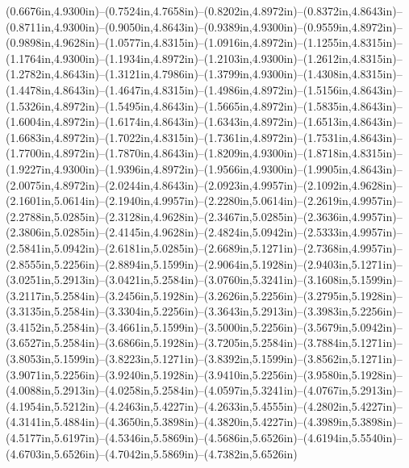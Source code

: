 (0.6676in,4.9300in)--(0.7524in,4.7658in)--(0.8202in,4.8972in)--(0.8372in,4.8643in)--(0.8711in,4.9300in)--(0.9050in,4.8643in)--(0.9389in,4.9300in)--(0.9559in,4.8972in)--(0.9898in,4.9628in)--(1.0577in,4.8315in)--(1.0916in,4.8972in)--(1.1255in,4.8315in)--(1.1764in,4.9300in)--(1.1934in,4.8972in)--(1.2103in,4.9300in)--(1.2612in,4.8315in)--(1.2782in,4.8643in)--(1.3121in,4.7986in)--(1.3799in,4.9300in)--(1.4308in,4.8315in)--(1.4478in,4.8643in)--(1.4647in,4.8315in)--(1.4986in,4.8972in)--(1.5156in,4.8643in)--(1.5326in,4.8972in)--(1.5495in,4.8643in)--(1.5665in,4.8972in)--(1.5835in,4.8643in)--(1.6004in,4.8972in)--(1.6174in,4.8643in)--(1.6343in,4.8972in)--(1.6513in,4.8643in)--(1.6683in,4.8972in)--(1.7022in,4.8315in)--(1.7361in,4.8972in)--(1.7531in,4.8643in)--(1.7700in,4.8972in)--(1.7870in,4.8643in)--(1.8209in,4.9300in)--(1.8718in,4.8315in)--(1.9227in,4.9300in)--(1.9396in,4.8972in)--(1.9566in,4.9300in)--(1.9905in,4.8643in)--(2.0075in,4.8972in)--(2.0244in,4.8643in)--(2.0923in,4.9957in)--(2.1092in,4.9628in)--(2.1601in,5.0614in)--(2.1940in,4.9957in)--(2.2280in,5.0614in)--(2.2619in,4.9957in)--(2.2788in,5.0285in)--(2.3128in,4.9628in)--(2.3467in,5.0285in)--(2.3636in,4.9957in)--(2.3806in,5.0285in)--(2.4145in,4.9628in)--(2.4824in,5.0942in)--(2.5333in,4.9957in)--(2.5841in,5.0942in)--(2.6181in,5.0285in)--(2.6689in,5.1271in)--(2.7368in,4.9957in)--(2.8555in,5.2256in)--(2.8894in,5.1599in)--(2.9064in,5.1928in)--(2.9403in,5.1271in)--(3.0251in,5.2913in)--(3.0421in,5.2584in)--(3.0760in,5.3241in)--(3.1608in,5.1599in)--(3.2117in,5.2584in)--(3.2456in,5.1928in)--(3.2626in,5.2256in)--(3.2795in,5.1928in)--(3.3135in,5.2584in)--(3.3304in,5.2256in)--(3.3643in,5.2913in)--(3.3983in,5.2256in)--(3.4152in,5.2584in)--(3.4661in,5.1599in)--(3.5000in,5.2256in)--(3.5679in,5.0942in)--(3.6527in,5.2584in)--(3.6866in,5.1928in)--(3.7205in,5.2584in)--(3.7884in,5.1271in)--(3.8053in,5.1599in)--(3.8223in,5.1271in)--(3.8392in,5.1599in)--(3.8562in,5.1271in)--(3.9071in,5.2256in)--(3.9240in,5.1928in)--(3.9410in,5.2256in)--(3.9580in,5.1928in)--(4.0088in,5.2913in)--(4.0258in,5.2584in)--(4.0597in,5.3241in)--(4.0767in,5.2913in)--(4.1954in,5.5212in)--(4.2463in,5.4227in)--(4.2633in,5.4555in)--(4.2802in,5.4227in)--(4.3141in,5.4884in)--(4.3650in,5.3898in)--(4.3820in,5.4227in)--(4.3989in,5.3898in)--(4.5177in,5.6197in)--(4.5346in,5.5869in)--(4.5686in,5.6526in)--(4.6194in,5.5540in)--(4.6703in,5.6526in)--(4.7042in,5.5869in)--(4.7382in,5.6526in) 
